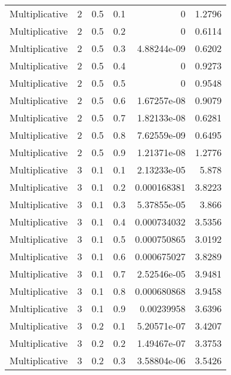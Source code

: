 \documentclass{article}
\begin{document}
\begin{longtable}[H]{lrrrrr}
 Multiplicative &       2 &   0.5 &            0.1 &   0           &          1.2796 \\
 Multiplicative &       2 &   0.5 &            0.2 &   0           &          0.6114 \\
 Multiplicative &       2 &   0.5 &            0.3 &   4.88244e-09 &          0.6202 \\
 Multiplicative &       2 &   0.5 &            0.4 &   0           &          0.9273 \\
 Multiplicative &       2 &   0.5 &            0.5 &   0           &          0.9548 \\
 Multiplicative &       2 &   0.5 &            0.6 &   1.67257e-08 &          0.9079 \\
 Multiplicative &       2 &   0.5 &            0.7 &   1.82133e-08 &          0.6281 \\
 Multiplicative &       2 &   0.5 &            0.8 &   7.62559e-09 &          0.6495 \\
 Multiplicative &       2 &   0.5 &            0.9 &   1.21371e-08 &          1.2776 \\
 Multiplicative &       3 &   0.1 &            0.1 &   2.13233e-05 &          5.878  \\
 Multiplicative &       3 &   0.1 &            0.2 &   0.000168381 &          3.8223 \\
 Multiplicative &       3 &   0.1 &            0.3 &   5.37855e-05 &          3.866  \\
 Multiplicative &       3 &   0.1 &            0.4 &   0.000734032 &          3.5356 \\
 Multiplicative &       3 &   0.1 &            0.5 &   0.000750865 &          3.0192 \\
 Multiplicative &       3 &   0.1 &            0.6 &   0.000675027 &          3.8289 \\
 Multiplicative &       3 &   0.1 &            0.7 &   2.52546e-05 &          3.9481 \\
 Multiplicative &       3 &   0.1 &            0.8 &   0.000680868 &          3.9458 \\
 Multiplicative &       3 &   0.1 &            0.9 &   0.00239958  &          3.6396 \\
 Multiplicative &       3 &   0.2 &            0.1 &   5.20571e-07 &          3.4207 \\
 Multiplicative &       3 &   0.2 &            0.2 &   1.49467e-07 &          3.3753 \\
 Multiplicative &       3 &   0.2 &            0.3 &   3.58804e-06 &          3.5426 \\

\end{longtable}
\end{document}
